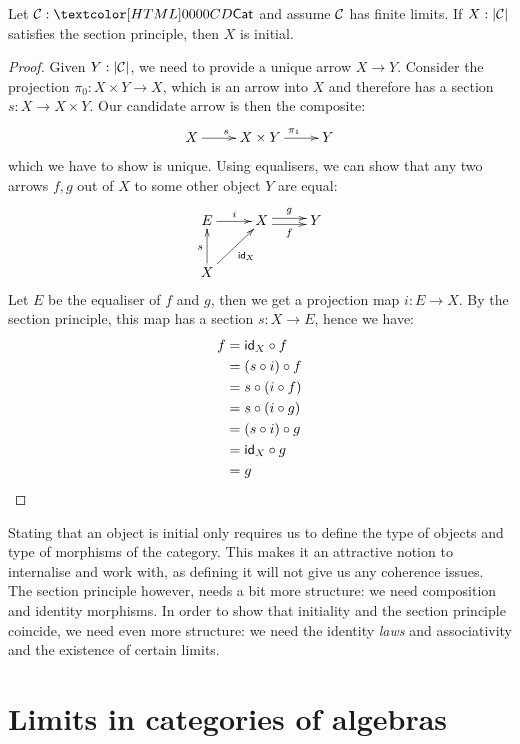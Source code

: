 \begin{lemma}
  \label{section-to-initiality}
  Let $\Cc: \Cat$ and assume $\mathcal{C}$ has finite limits. If $X : | \mathcal{C} |$
  satisfies the section principle, then $X$ is initial.
\end{lemma}
\begin{proof}
  Given $Y : |\mathcal{C}|$, we need to provide a unique arrow $X \to
  Y$. Consider the projection $\pi_0 : X \times Y \to X$, which is an
  arrow into $X$ and therefore has a section $s : X \to X \times
  Y$. Our candidate arrow is then the composite:
  $$
  \xymatrix{
    X \ar[r]^{s} &X \times Y \ar[r]^{\pi_1} &Y
  }
  $$
  which we have to show is unique. Using equalisers, we can show that
  any two arrows $f,g$ out of $X$ to some other object $Y$ are equal:
  \[
    \xymatrix{
      E \ar[r]^{i} &X \ar@<-.5ex>[r]_-{f} \ar@<.5ex>[r]^-{g} &Y \\
      X \ar[u]^{s} \ar[ur]_{\id_{X}}
    }
  \]
  Let $E$ be the equaliser of $f$ and $g$, then we get a projection map
  $i : E \to X$. By the section principle, this map has a section
  $s : X \to E$, hence we have:
  \begin{align*}
    f &= \id_X \circ f \\
      &= (s \circ i) \circ f \\
      &= s \circ (i \circ f) \\
      &= s \circ (i \circ g) \\
      &= (s \circ i) \circ g \\
      &= \id_X \circ g \\
      &= g
  \end{align*}
\end{proof}

Stating that an object is initial only requires us to define the type
of objects and type of morphisms of the category. This makes it an
attractive notion to internalise and work with, as defining it will
not give us any coherence issues. The section principle however, needs
a bit more structure: we need composition and identity morphisms. In
order to show that initiality and the section principle coincide, we
need even more structure: we need the identity \emph{laws} and
associativity and the existence of certain limits.

\section{Limits in categories of algebras}
\label{limits-in-categories-of-algebras}


